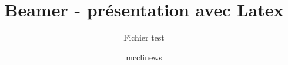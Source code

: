 \documentclass[t,12pt]{beamer}
\title{Beamer - présentation avec Latex}
\subtitle{Fichier test}
\author{mcclinews}
\date{\oldstylenums{Mai 2007}}
\begin{document}
\frame{\titlepage}





\end{document}
